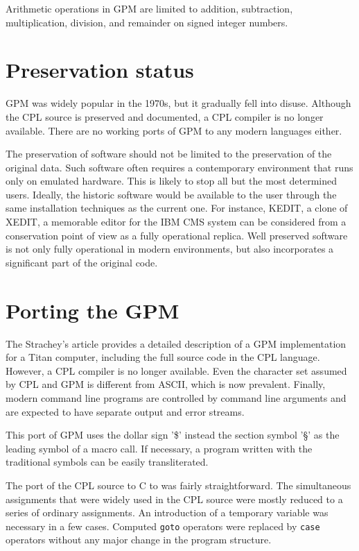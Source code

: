 \documentclass[letterpaper,10pt]{article}
\begin{document}
Arithmetic operations in GPM are limited to addition, subtraction,
multiplication, division, and remainder on signed integer numbers.

\section{Preservation status}
GPM was widely popular in the 1970s, but it gradually fell into disuse.
Although the CPL source is preserved and documented, a CPL
compiler is no longer available. There are no working ports of
GPM to any modern languages either.

The preservation of software should not be limited to the preservation of
the original data. Such software often requires a contemporary
environment that runs only on emulated hardware. 
This is likely to stop all but the most determined users.
Ideally, the historic software would be available to the user through
the same installation techniques as the current one. For instance,
KEDIT, a clone of XEDIT, a memorable editor for the IBM CMS system can be considered 
from a conservation point of view as a fully operational replica.
Well preserved software is not only fully operational in modern environments,
but also incorporates a significant part of the original code.

\section{Porting the GPM}
The Strachey's article provides a detailed description of a GPM implementation
for a Titan computer, including the full source code in the CPL language.
However, a CPL compiler is no longer available. Even the character set assumed 
by CPL and GPM is different from ASCII, which is
now prevalent. Finally, modern command line programs are controlled by command line arguments and
are expected to have separate output and error streams.

This port of GPM uses the dollar sign '\$' instead the section symbol '\S'
as the leading symbol of a macro call. If necessary, a program written
with the traditional symbols can be easily transliterated.

The port of the CPL source to C to was fairly straightforward. The simultaneous assignments
that were widely used in the CPL source were mostly reduced to a series of ordinary assignments. 
An introduction of a temporary variable was necessary in a few cases. Computed \texttt{goto}
operators were replaced by \texttt{case} operators without any major change in
the program structure.
\end{document}
